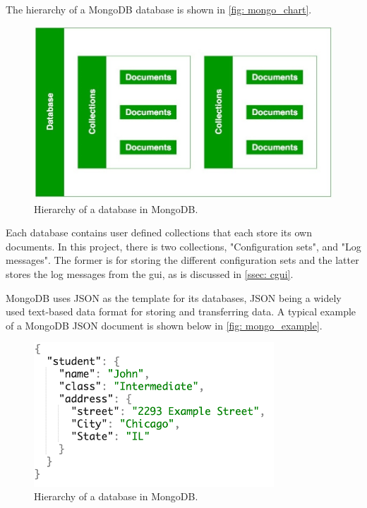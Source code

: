 \documentclass[main.tex]{subfiles}
\begin{document}
The hierarchy of a MongoDB database is shown in \autoref{fig: mongo_chart}.

\begin{figure}[!ht]
    \centering
    \includegraphics[width=12cm, scale=1.5]{images/mongodb-nosql-working.jpg}
    \caption{Hierarchy of a database in MongoDB.}
    \label{fig: mongo_chart}
\end{figure}
\FloatBarrier

Each database contains user defined collections that each store its own documents. In this project, there is two collections, "Configuration sets", and "Log messages". The former is for storing the different configuration sets and the latter stores the log messages from the \gls{gui}, as is discussed in \autoref{ssec: cgui}.

MongoDB uses JSON as the template for its databases, JSON being a widely used text-based data format for storing and transferring data. A typical example of a MongoDB JSON document is shown below in \autoref{fig: mongo_example}.

\begin{figure}[!ht]
    \centering
    \includegraphics[width=9cm, scale=1.5]{images/mongodb_document_example.png}
    \caption{Hierarchy of a database in MongoDB.}
    \label{fig: mongo_example}
\end{figure}
\FloatBarrier
\end{document}
